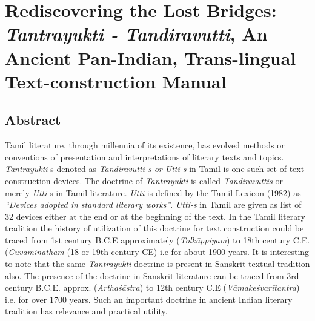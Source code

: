 
\chapter{Rediscovering the Lost Bridges: \textit{Tantrayukti - Tandiravutti}, An Ancient Pan-Indian, Trans-lingual Text-construction Manual}



\section*{Abstract}

Tamil literature, through millennia of its existence, has evolved methods or conventions of presentation and interpretations of literary texts and topics. \textit{Tantrayukti}-s denoted as \textit{Tandiravutti-s or Utti-s} in Tamil is one such set of text construction devices. The doctrine of \textit{Tantrayukti} is called \textit{Tandiravuttis} or merely \textit{Utti}-s in Tamil literature. \textit{Utti} is defined by the Tamil Lexicon (1982) as \textit{“Devices adopted in standard literary works”}. \textit{Utti-s} in Tamil are given as list of 32 devices either at the end or at the beginning of the text. In the Tamil literary tradition the history of utilization of this doctrine for text construction could be traced from 1st century B.C.E approximately (\textit{Tolkāppiyam}) to 18th century C.E. (\textit{Cuvāminātham} (18 or 19th century CE) i.e for about 1900 years. It is interesting to note that the same \textit{Tantrayukti} doctrine is present in Sanskrit textual tradition also. The presence of the doctrine in Sanskrit literature can be traced from 3rd century B.C.E. approx. (\textit{Arthaśāstra}) to 12th century C.E (\textit{Vāmakeśvarītantra}) i.e. for over 1700 years. Such an important doctrine in ancient Indian literary tradition has relevance and practical utility.

